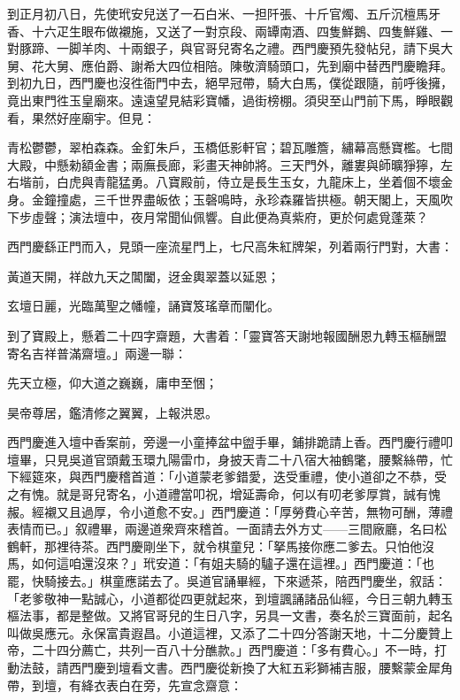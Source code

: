到正月初八日，先使玳安兒送了一石白米、一担阡張、十斤官燭、五斤沉檀馬牙香、十六疋生眼布做襯施，又送了一對京段、兩罈南酒、四隻鮮鵝、四隻鮮雞、一對豚蹄、一脚羊肉、十兩銀子，與官哥兒寄名之禮。西門慶預先發帖兒，請下吳大舅、花大舅、應伯爵、謝希大四位相陪。陳敬濟騎頭口，先到廟中替西門慶瞻拜。到初九日，西門慶也沒徃衙門中去，絕早冠帶，騎大白馬，僕從跟隨，前呼後擁，竟出東門徃玉皇廟來。遠遠望見結彩寶幡，過街榜棚。須臾至山門前下馬，睜眼觀看，果然好座廟宇。但見：

\begin{myquote}
青松鬱鬱，翠柏森森。金釘朱戶，玉橋低影軒官；碧瓦雕簷，繡幕高懸寶檻。七間大殿，中懸勑額金書；兩廡長廊，彩畫天神帥將。三天門外，離婁與師曠猙獰，左右堦前，白虎與青龍猛勇。八寶殿前，侍立是長生玉女，九龍床上，坐着個不壞金身。金鐘撞處，三千世界盡皈依；玉磬鳴時，永珍森羅皆拱極。朝天閣上，天風吹下步虛聲；演法壇中，夜月常聞仙佩響。自此便為真紫府，更於何處覓蓬萊？
\end{myquote}

西門慶繇正門而入，見頭一座流星門上，七尺高朱紅牌架，列着兩行門對，大書：

\begin{myquote}
黃道天開，祥啟九天之閶闔，迓金輿翠蓋以延恩；

玄壇日麗，光臨萬聖之幡幢，誦寶笈瑤章而闡化。
\end{myquote}

到了寶殿上，懸着二十四字齋題，大書着：「靈寶答天謝地報國酬恩九轉玉樞酬盟寄名吉祥普滿齋壇。」兩邊一聯：

\begin{myquote}
先天立極，仰大道之巍巍，庸申至悃；

昊帝尊居，鑑清修之翼翼，上報洪恩。
\end{myquote}

西門慶進入壇中香案前，旁邊一小童捧盆中盥手畢，鋪排跪請上香。西門慶行禮叩壇畢，只見吳道官頭戴玉環九陽雷巾，身披天青二十八宿大袖鶴氅，腰繫絲帶，忙下經筵來，與西門慶稽首道：「小道蒙老爹錯愛，迭受重禮，使小道卻之不恭，受之有愧。就是哥兒寄名，小道禮當叩祝，增延壽命，何以有叨老爹厚賞，誠有愧赧。經襯又且過厚，令小道愈不安。」西門慶道：「厚勞費心辛苦，無物可酬，薄禮表情而已。」叙禮畢，兩邊道衆齊來稽首。一面請去外方丈——三間廠廳，名曰松鶴軒，那裡待茶。西門慶剛坐下，就令棋童兒：「拏馬接你應二爹去。只怕他沒馬，如何這咱還沒來？」玳安道：「有姐夫騎的驢子還在這裡。」西門慶道：「也罷，快騎接去。」棋童應諾去了。吳道官誦畢經，下來遞茶，陪西門慶坐，叙話：「老爹敬神一點誠心，小道都從四更就起來，到壇諷誦諸品仙經，今日三朝九轉玉樞法事，都是整做。又將官哥兒的生日八字，另具一文書，奏名於三寶面前，起名叫做吳應元。永保富貴遐昌。小道這裡，又添了二十四分答謝天地，{}十二分慶贊上帝，二十四分薦亡，共列一百八十分醮款。」西門慶道：「多有費心。」不一時，打動法鼓，請西門慶到壇看文書。西門慶從新換了大紅五彩獅補吉服，腰繫蒙金犀角帶，到壇，有絳衣表白在旁，先宣念齋意：

